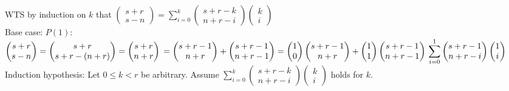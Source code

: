 \documentclass[10pt]{article}
\begin{document}
\begin{enumerate}[label= (Q-\arabic*)]
    WTS by induction on $k$ that $\displaystyle \begin{pmatrix}s+r\\ s-n \end{pmatrix}=\sum_{i=0}^{k}\begin{pmatrix}s+r-k\\ n+r-i \end{pmatrix}\begin{pmatrix}k\\ i\end{pmatrix}$\\
    Base case: $P(1)$: $\displaystyle\begin{pmatrix}s+r\\ s-n \end{pmatrix}=\begin{pmatrix}s+r\\ s+r-(n+r) \end{pmatrix}=\begin{pmatrix}s+r\\ n+r \end{pmatrix}\\
    =\begin{pmatrix}s+r-1\\ n+r \end{pmatrix}+\begin{pmatrix}s+r-1\\ n+r-1 \end{pmatrix}=\begin{pmatrix}1\\ 0 \end{pmatrix}\begin{pmatrix}s+r-1\\ n+r \end{pmatrix}+\begin{pmatrix}1\\ 1 \end{pmatrix}\begin{pmatrix}s+r-1\\ n+r-1 \end{pmatrix}\\
    \displaystyle\sum_{i=0}^{1}\begin{pmatrix}s+r-1\\ n+r-i \end{pmatrix}\begin{pmatrix}1\\ i\end{pmatrix}$\\
    Induction hypothesis: Let $0\le k<r$ be arbitrary. Assume $\displaystyle\sum_{i=0}^{k}\begin{pmatrix}s+r-k\\ n+r-i \end{pmatrix}\begin{pmatrix}k\\ i\end{pmatrix}$ holds for $k$.\\

\end{enumerate}
\end{document}
